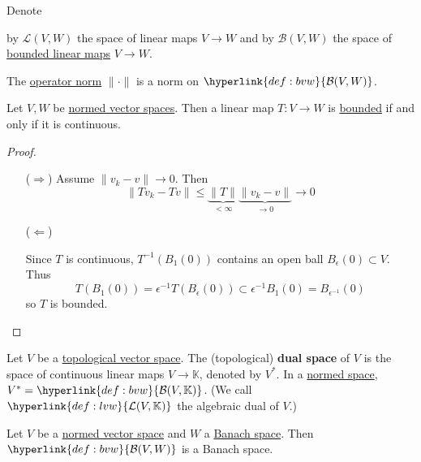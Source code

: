 \documentclass{article}
\newcommand{\K}{\mathbb{K}}
\begin{document}
\hypertarget{def:lvw}{\hypertarget{def:bvw}{Denote}} by $\mathcal{L}(V,W)$ the space of linear maps $V \to W$ and by $\mathcal{B}(V, W)$ the space of \hyperlink{def:boundedLinearMap}{bounded linear maps} $V \to W$.

\begin{fact}
    The \hyperlink{def:opNorm}{operator norm} $\|\cdot\|$ is a norm on $\hyperlink{def:bvw}{\mathcal{B}(V, W)}$.
\end{fact}

\begin{prop}
    Let $V, W$ be \hyperlink{def:nvs}{normed vector spaces}. Then a linear map $T: V \to W$ is \hyperlink{def:boundedLinearMap}{bounded} if and only if it is continuous.
\end{prop}

\begin{proof}
    \leavevmode
    \begin{itemize}
        \item[($\Rightarrow$)]
            Assume $\|v_k - v\| \to 0$. Then
            \begin{equation*}
                \|T v_k - T v\| \leq \underbrace{\|T\|}_{< \infty} \underbrace{\|v_k - v\|}_{\to 0} \to 0
            \end{equation*}
        \item[($\Leftarrow$)]

            Since $T$ is continuous, $T^{-1} (B_1(0))$ contains an open ball $B_\epsilon(0) \subset V$. Thus
            \begin{equation*}
                T(B_1(0)) = \epsilon^{-1} T(B_\epsilon(0)) \subset \epsilon^{-1} B_1(0) = B_{\epsilon^{-1}}(0)
            \end{equation*}
            so $T$ is bounded. \qedhere
    \end{itemize}
\end{proof}

\begin{defi}
    Let $V$ be a \hyperlink{def:tVS}{topological vector space}.
    The (topological) \textbf{dual space} of $V$ is the space of continuous linear maps $V \to \K$, denoted by $V^*$.
    In a \hyperlink{def:nvs}{normed space}, $V^* = \hyperlink{def:bvw}{\mathcal{B}(V, \K)}$.
    (We call $\hyperlink{def:lvw}{\mathcal{L}(V, \K)}$ the algebraic dual of $V$.)
\end{defi}

\begin{prop}
    Let $V$ be a \hyperlink{def:nvs}{normed vector space} and $W$ a \hyperlink{def:banach}{Banach space}.
    Then $\hyperlink{def:bvw}{\mathcal{B}(V, W)}$ is a Banach space.
\end{prop}
\end{document}
